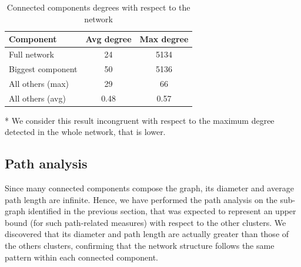 \documentclass[sigchi]{acmart}
\begin{document}
\begin{table}
  \caption[Connected components degrees with respect to the network]{Connected components degrees with respect to the network}
  \label{tab:connected_components_degree}
  
\begin{threeparttable}
  \begin{tabular}{lcc}
    \toprule
    Component & Avg degree & Max degree\\
    \midrule
    Full network    & 24 & 5134\\
    Biggest component & 50  & 5136\tnote{*} \\
    All others (max) & 29    & 66 \\
    All others (avg) & 0.48    & 0.57 \\
  \bottomrule
\end{tabular}
\begin{tablenotes}
    \begin{flushleft}
      \item[*] We consider this result incongruent with respect to the maximum degree detected in the whole network, that is lower.
    \end{flushleft}
\end{tablenotes}
\end{threeparttable}
\end{table}


\subsection{Path analysis}
Since many connected components compose the graph, its diameter and average path length are infinite. Hence, we have performed the path analysis on the sub-graph identified in the previous section, that was expected to represent an upper bound (for such path-related measures) with respect to the other clusters. We discovered that its diameter and path length are actually greater than those of the others clusters, confirming that the network structure follows the same pattern within each connected component.\\
\end{document}
